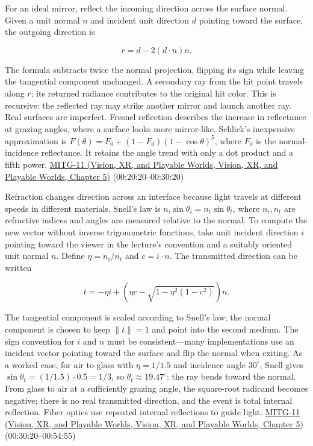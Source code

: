 For an ideal mirror, reflect the incoming direction across the surface normal. Given a unit normal \(n\) and incident unit direction \(d\) pointing toward the surface, the outgoing direction is

\[
r=d-2(d\cdot n)n.
\]

The formula subtracts twice the normal projection, flipping its sign while leaving the tangential component unchanged. A secondary ray from the hit point travels along \(r\); its returned radiance contributes to the original hit color. This is recursive: the reflected ray may strike another mirror and launch another ray. Real surfaces are imperfect. Fresnel reflection describes the increase in reflectance at grazing angles, where a surface looks more mirror-like. Schlick's inexpensive approximation is \(F(\theta)=F_0+(1-F_0)(1-\cos\theta)^5\), where \(F_0\) is the normal-incidence reflectance. It retains the angle trend with only a dot product and a fifth power. \href{../07-Vision-XR-and-Playable-Worlds/main.pdf\#nameddest=04-visual-computing-ii-ch036-mitg-11---ray-tracing}{MITG-11 (Vision, XR, and Playable Worlds, Vision, XR, and Playable Worlds, Chapter 5)} (00:20:20--00:30:20)

Refraction changes direction across an interface because light travels at different speeds in different materials. Snell's law is \(n_i\sin\theta_i=n_t\sin\theta_t\), where \(n_i,n_t\) are refractive indices and angles are measured relative to the normal. To compute the new vector without inverse trigonometric functions, take unit incident direction \(i\) pointing toward the viewer in the lecture's convention and a suitably oriented unit normal \(n\). Define \(\eta=n_i/n_t\) and \(c=i\cdot n\). The transmitted direction can be written

\[
t=-\eta i+\left(\eta c-\sqrt{1-\eta^2(1-c^2)}\right)n.
\]

The tangential component is scaled according to Snell's law; the normal component is chosen to keep \(\|t\|=1\) and point into the second medium. The sign convention for \(i\) and \(n\) must be consistent---many implementations use an incident vector pointing toward the surface and flip the normal when exiting. As a worked case, for air to glass with \(\eta=1/1.5\) and incidence angle \(30^\circ\), Snell gives \(\sin\theta_t=(1/1.5)\cdot0.5=1/3\), so \(\theta_t\approx19.47^\circ\): the ray bends toward the normal. From glass to air at a sufficiently grazing angle, the square-root radicand becomes negative; there is no real transmitted direction, and the event is total internal reflection. Fiber optics use repeated internal reflections to guide light. \href{../07-Vision-XR-and-Playable-Worlds/main.pdf\#nameddest=04-visual-computing-ii-ch036-mitg-11---ray-tracing}{MITG-11 (Vision, XR, and Playable Worlds, Vision, XR, and Playable Worlds, Chapter 5)} (00:30:20--00:54:55)

